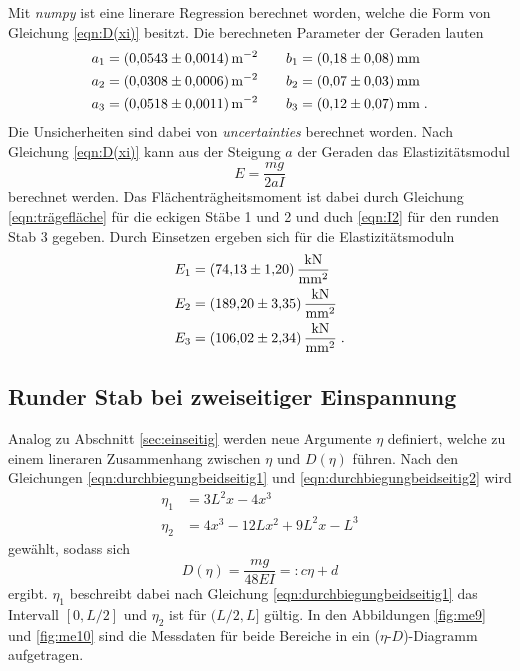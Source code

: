 \noindent Mit \textit{numpy}
\cite{numpy} ist eine linerare Regression berechnet worden, welche die Form von Gleichung \eqref{eqn:D(xi)} besitzt. Die berechneten
Parameter der Geraden lauten
\begin{align*}
    a_1&=\SI[per-mode=reciprocal]{0.0543 \pm 0.0014}{\per\square\metre} \qquad
    b_1=\SI{0.18   \pm 0.08}{\milli\metre}      \\
    a_2&=\SI[per-mode=reciprocal]{0.0308 \pm 0.0006}{\per\square\metre} \qquad
    b_2=\SI{0.07  \pm 0.03}  {\milli\metre}       \\
    a_3&=\SI[per-mode=reciprocal]{0.0518 \pm 0.0011}{\per\square\metre} \qquad
    b_3=\SI{0.12   \pm 0.07}   {\milli\metre}         \;.
\end{align*}
Die Unsicherheiten sind dabei von \textit{uncertainties} \cite{uncertainties} berechnet worden.
Nach Gleichung \eqref{eqn:D(xi)} kann aus der Steigung $a$ der Geraden das Elastizitätsmodul
\begin{equation}
    E=\frac{mg}{2aI}
    \label{eqn:E}
\end{equation}
berechnet werden. Das Flächenträgheitsmoment ist dabei durch Gleichung \eqref{eqn:trägefläche} für die eckigen Stäbe 1 und 2 und duch \eqref{eqn:I2}
für den runden Stab 3 gegeben. Durch Einsetzen ergeben sich für die Elastizitätsmoduln
\begin{align*}
    E_1&=\SI{ 74.13 \pm 1.20}{\kilo\newton\per\square\milli\metre}\\
    E_2&=\SI{189.20 \pm 3.35}{\kilo\newton\per\square\milli\metre}\\
    E_3&=\SI{106.02 \pm 2.34}{\kilo\newton\per\square\milli\metre} \;.
\end{align*}

\subsection{Runder Stab bei zweiseitiger Einspannung}
\label{sec:zweiseitig}
Analog zu Abschnitt \ref{sec:einseitig} werden neue Argumente $\eta$ definiert, welche zu einem lineraren Zusammenhang zwischen
$\eta$ und $D(\eta)$ führen. Nach den Gleichungen \eqref{eqn:durchbiegungbeidseitig1} und \eqref{eqn:durchbiegungbeidseitig2} wird
\begin{align*}
    \eta_1&=3L^2x-4x^3 \\
    \eta_2&=4x^3-12Lx^2+9L^2x-L^3
\end{align*}
gewählt, sodass sich
\begin{equation}
    D(\eta)=\frac{mg}{48EI}=:c\eta+d
\end{equation}
ergibt. $\eta_1$ beschreibt dabei nach Gleichung \eqref{eqn:durchbiegungbeidseitig1} das Intervall $[0,L/2]$ und $\eta_2$ ist für $(L/2,L]$ gültig. In den Abbildungen
\ref{fig:me9} und \ref{fig:me10} sind die Messdaten für beide Bereiche in ein ($\eta$-$D$)-Diagramm aufgetragen.

